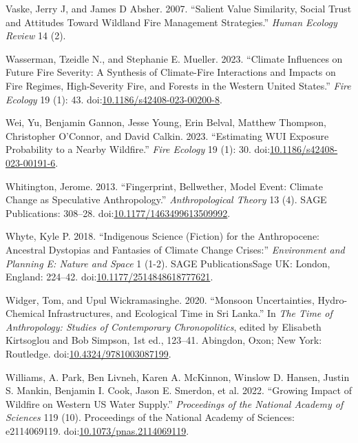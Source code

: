 \documentclass[
]{article}
\newlength{\cslhangindent}
\newenvironment{CSLReferences}[2] %
 {\begin{list}{}{%
  \setlength{\itemindent}{0pt}
  \setlength{\leftmargin}{0pt}
  \setlength{\parsep}{0pt}
  \ifodd #1
   \setlength{\leftmargin}{\cslhangindent}
   \setlength{\itemindent}{-1\cslhangindent}
  \fi
  \setlength{\itemsep}{#2\baselineskip}}}
 {\end{list}}
\begin{document}
\begin{CSLReferences}{1}{0}
Vaske, Jerry J, and James D Absher. 2007. {``Salient {Value Similarity}, {Social Trust} and {Attitudes} Toward {Wildland Fire Management Strategies}.''} \emph{Human Ecology Review} 14 (2).

Wasserman, Tzeidle N., and Stephanie E. Mueller. 2023. {``Climate Influences on Future Fire Severity: A Synthesis of Climate-Fire Interactions and Impacts on Fire Regimes, High-Severity Fire, and Forests in the Western {United States}.''} \emph{Fire Ecology} 19 (1): 43. doi:\href{https://doi.org/10.1186/s42408-023-00200-8}{10.1186/s42408-023-00200-8}.

Wei, Yu, Benjamin Gannon, Jesse Young, Erin Belval, Matthew Thompson, Christopher O'Connor, and David Calkin. 2023. {``Estimating {WUI} Exposure Probability to a Nearby Wildfire.''} \emph{Fire Ecology} 19 (1): 30. doi:\href{https://doi.org/10.1186/s42408-023-00191-6}{10.1186/s42408-023-00191-6}.

Whitington, Jerome. 2013. {``Fingerprint, Bellwether, Model Event: {Climate} Change as Speculative Anthropology.''} \emph{Anthropological Theory} 13 (4). SAGE Publications: 308--28. doi:\href{https://doi.org/10.1177/1463499613509992}{10.1177/1463499613509992}.

Whyte, Kyle P. 2018. {``Indigenous Science (Fiction) for the {Anthropocene}: {Ancestral} Dystopias and Fantasies of Climate Change Crises:''} \emph{Environment and Planning E: Nature and Space} 1 (1-2). SAGE PublicationsSage UK: London, England: 224--42. doi:\href{https://doi.org/10.1177/2514848618777621}{10.1177/2514848618777621}.

Widger, Tom, and Upul Wickramasinghe. 2020. {``Monsoon Uncertainties, Hydro-Chemical Infrastructures, and Ecological Time in {Sri Lanka}.''} In \emph{The {Time} of {Anthropology}: {Studies} of {Contemporary Chronopolitics}}, edited by Elisabeth Kirtsoglou and Bob Simpson, 1st ed., 123--41. Abingdon, Oxon; New York: Routledge. doi:\href{https://doi.org/10.4324/9781003087199}{10.4324/9781003087199}.

Williams, A. Park, Ben Livneh, Karen A. McKinnon, Winslow D. Hansen, Justin S. Mankin, Benjamin I. Cook, Jason E. Smerdon, et al. 2022. {``Growing Impact of Wildfire on Western {US} Water Supply.''} \emph{Proceedings of the National Academy of Sciences} 119 (10). Proceedings of the National Academy of Sciences: e2114069119. doi:\href{https://doi.org/10.1073/pnas.2114069119}{10.1073/pnas.2114069119}.


\end{CSLReferences}
\end{document}
